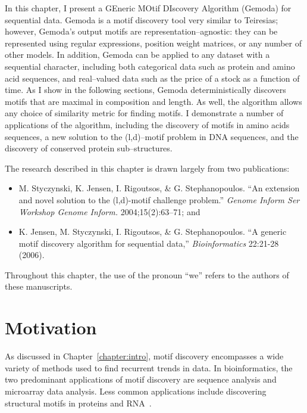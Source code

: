 In this chapter, I present a GEneric MOtif DIscovery Algorithm
(Gemoda) for sequential data.  Gemoda is a motif discovery tool very
similar to Teiresias; however, Gemoda's output motifs are
representation--agnostic: they can be represented using regular
expressions, position weight matrices, or any number of other
models. In addition, Gemoda can be applied to any dataset with a
sequential character, including both categorical data such as
protein and amino acid sequences, and real--valued data such as the
price of a stock as a function of time. As I show in the following
sections, Gemoda deterministically discovers motifs that are maximal
in composition and length.  As well, the algorithm allows any choice
of similarity metric for finding motifs. I demonstrate a number of
applications of the algorithm, including the discovery of motifs in
amino acids sequences, a new solution to the (l,d)--motif problem in
DNA sequences, and the discovery of conserved protein
sub--structures.

The research described in this chapter is drawn
largely from two publications:
    \begin{itemize}
    \item M. Styczynski, K. Jensen, I. Rigoutsos, \&
    G. Stephanopoulos. ``An extension and novel solution to the
    (l,d)-motif challenge problem.'' 
    \emph{Genome Inform Ser Workshop Genome Inform.} 2004;15(2):63--71; and

    \item K. Jensen, M. Styczynski, I. Rigoutsos, \& G. Stephanopoulos.
    ``A generic motif discovery algorithm for sequential data,''
    \emph{Bioinformatics} 22:21-28 (2006).
    \end{itemize}
    Throughout this
    chapter, the use of the pronoun ``we'' refers to the
    authors of these  manuscripts.

\section{Motivation}

As discussed in Chapter~\vref{chapter:intro}, motif discovery
encompasses a wide variety of methods used to find recurrent trends
in data. In bioinformatics, the two predominant applications of
motif discovery are sequence analysis and microarray data analysis.
Less common applications include discovering structural motifs in
proteins and RNA~\citep{holm1992database,murthy2003rnabase}.

